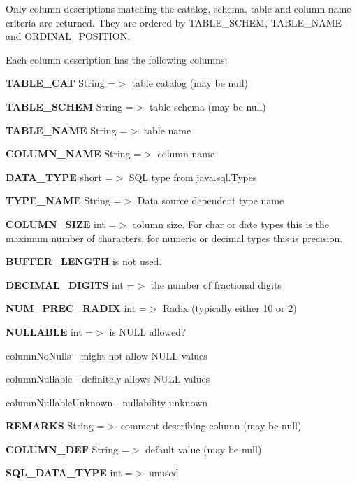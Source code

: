 Only column descriptions matching the catalog, schema, table and column name criteria are returned. They are ordered by T\+A\+B\+L\+E\+\_\+\+S\+C\+H\+EM, T\+A\+B\+L\+E\+\_\+\+N\+A\+ME and O\+R\+D\+I\+N\+A\+L\+\_\+\+P\+O\+S\+I\+T\+I\+ON. 

Each column description has the following columns\+: 
\begin{DoxyEnumerate}
\item {\bfseries T\+A\+B\+L\+E\+\_\+\+C\+AT} String =$>$ table catalog (may be null) 
\item {\bfseries T\+A\+B\+L\+E\+\_\+\+S\+C\+H\+EM} String =$>$ table schema (may be null) 
\item {\bfseries T\+A\+B\+L\+E\+\_\+\+N\+A\+ME} String =$>$ table name 
\item {\bfseries C\+O\+L\+U\+M\+N\+\_\+\+N\+A\+ME} String =$>$ column name 
\item {\bfseries D\+A\+T\+A\+\_\+\+T\+Y\+PE} short =$>$ S\+QL type from java.\+sql.\+Types 
\item {\bfseries T\+Y\+P\+E\+\_\+\+N\+A\+ME} String =$>$ Data source dependent type name 
\item {\bfseries C\+O\+L\+U\+M\+N\+\_\+\+S\+I\+ZE} int =$>$ column size. For char or date types this is the maximum number of characters, for numeric or decimal types this is precision. 
\item {\bfseries B\+U\+F\+F\+E\+R\+\_\+\+L\+E\+N\+G\+TH} is not used. 
\item {\bfseries D\+E\+C\+I\+M\+A\+L\+\_\+\+D\+I\+G\+I\+TS} int =$>$ the number of fractional digits 
\item {\bfseries N\+U\+M\+\_\+\+P\+R\+E\+C\+\_\+\+R\+A\+D\+IX} int =$>$ Radix (typically either 10 or 2) 
\item {\bfseries N\+U\+L\+L\+A\+B\+LE} int =$>$ is N\+U\+LL allowed? 
\begin{DoxyItemize}
\item column\+No\+Nulls -\/ might not allow N\+U\+LL values 
\item column\+Nullable -\/ definitely allows N\+U\+LL values 
\item column\+Nullable\+Unknown -\/ nullability unknown 
\end{DoxyItemize}
\item {\bfseries R\+E\+M\+A\+R\+KS} String =$>$ comment describing column (may be null) 
\item {\bfseries C\+O\+L\+U\+M\+N\+\_\+\+D\+EF} String =$>$ default value (may be null) 
\item {\bfseries S\+Q\+L\+\_\+\+D\+A\+T\+A\+\_\+\+T\+Y\+PE} int =$>$ unused 

\end{DoxyEnumerate}
